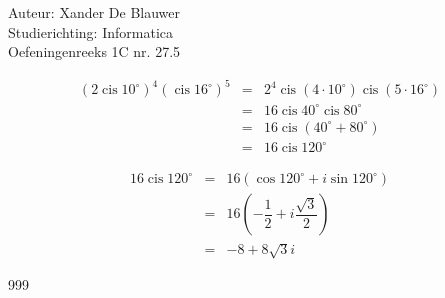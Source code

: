 \documentclass[a4paper]{article}
\begin{document}
\noindent \large Auteur: Xander De Blauwer \\
\noindent \large Studierichting: Informatica\\
\noindent \large Oefeningenreeks 1C nr. 27.5\\

\medskip

\normalsize


\begin{eqnarray*}
(2\operatorname{cis}10^\circ)^4 (\operatorname{cis}16^\circ)^5
&=& 2^4 \operatorname{cis}(4\cdot 10^\circ) \operatorname{cis}(5\cdot 16^\circ) \\
&=& 16 \operatorname{cis}40^\circ \operatorname{cis}80^\circ \\
&=& 16 \operatorname{cis}(40^\circ + 80^\circ) \\
&=& 16 \operatorname{cis}120^\circ
\end{eqnarray*}

\begin{eqnarray*}
16 \operatorname{cis}120^\circ
&=& 16\left(\cos120^\circ + i\sin120^\circ\right) \\
&=& 16\left(-\dfrac{1}{2} + i\dfrac{\sqrt{3}}{2}\right) \\
&=& -8 + 8\sqrt{3}i
\end{eqnarray*}







\begin{thebibliography}{999}
\end{thebibliography}
\end{document}
